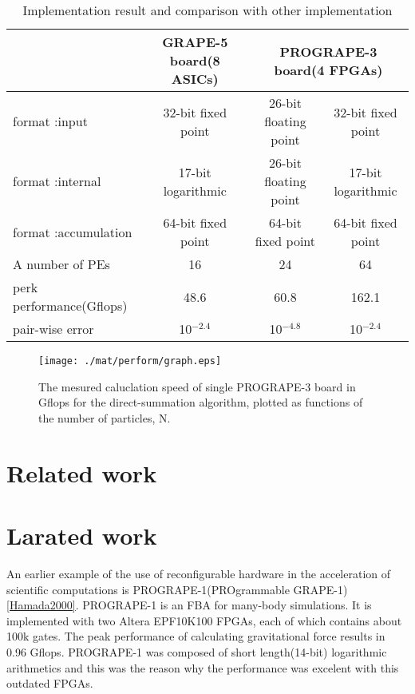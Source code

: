 \documentclass[times, 10pt,twocolumn]{article}
\begin{document}
\begin{table*}
\caption{Implementation result and comparison with other implementation}
\begin{center}
\begin{tabular}{lccc}
\hline
\hline
                     & GRAPE-5 board(8 ASICs) & \multicolumn{2}{c}{PROGRAPE-3 board(4 FPGAs)}  \\
\hline
format :input        & 32-bit fixed point  & 26-bit floating point & 32-bit fixed point \\
format :internal     & 17-bit logarithmic  & 26-bit floating point & 17-bit logarithmic \\
format :accumulation & 64-bit fixed point  & 64-bit fixed point    & 64-bit fixed point \\
A number of PEs      & 16                  &   24                  &   64               \\
perk performance(Gflops)    & 48.6         & 60.8                  & 162.1              \\
pair-wise error             & 10$^{-2.4}$   &  10$^{-4.8}$ & 10$^{-2.4}$                \\

\hline
\hline
\end{tabular}
\end{center}
\label{tabcompg5}
\end{table*}

\begin{figure}[htb]
\begin{center}
\texttt{[image: ./mat/perform/graph.eps]}
\caption{The mesured caluclation speed of single PROGRAPE-3 board in Gflops for the direct-summation algorithm, plotted as functions of the number of particles, N.}
\label{MESURE-PERFORM}
\end{center}
\end{figure}


\section{Related work}
\section{Larated work}
An earlier example of the use of reconfigurable hardware in the
acceleration of scientific computations is PROGRAPE-1(PROgrammable
GRAPE-1)\ref{Hamada2000}. PROGRAPE-1 is an FBA for many-body
simulations. It is implemented with two Altera EPF10K100 FPGAs, each
of which contains about 100k gates. The peak performance of
calculating gravitational force results in 0.96 Gflops.  PROGRAPE-1
was composed of short length(14-bit) logarithmic arithmetics and this
was the reason why the performance was excelent with this outdated
FPGAs.
\end{document}
